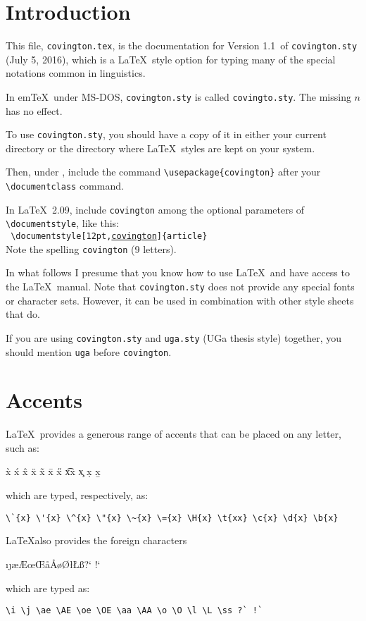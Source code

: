 \documentclass{article}
\def\pversion{Version 1.1}
\def\pdate{July 5, 2016}
\begin{document}
\section*{Introduction}
This file, \texttt{covington.tex}, is the documentation for \pversion\
of \texttt{covington.sty} (\pdate), which is a \LaTeX\ style 
option for typing many of the special notations common in linguistics.

{\footnotesize 
In em\TeX\ under MS-DOS, \texttt{covington.sty} is called \texttt{covingto.sty}.
The missing $n$ has no effect.}

To use \texttt{covington.sty}, you should have a copy of it in either your
current directory or the directory where \LaTeX\ styles are kept on your 
system.

Then, under \LaTeXe,
include the command
\verb"\usepackage{covington}"
after your \verb"\documentclass" command.

{\footnotesize
In \LaTeX\ 2.09,
include \texttt{covington} among the optional parameters of 
\verb"\documentstyle", like this: \hfill\\
{\tt
\verb"\documentstyle[12pt,"\underline{covington}\verb"]{article}"
}\hfill\\
Note the spelling \texttt{covington} (9 letters).
}

In what follows I presume that you know how to use \LaTeX\ and have 
access to the \LaTeX\ manual. Note that \texttt{covington.sty} does not 
provide any special fonts or character sets.  However, it can be used in 
combination with other style sheets that do.

If you are using \texttt{covington.sty} and \texttt{uga.sty} (UGa thesis style) 
together, you should mention \texttt{uga} before \texttt{covington}.

 
\section{Accents}

\LaTeX\ provides a generous range of accents that can be placed on any
letter, such as:
\begin{flushleft}
\`{x} \'{x} \^{x} \"{x} \~{x} \={x} \H{x} \t{xx} \c{x} \d{x} \b{x}
\end{flushleft}
which are typed, respectively, as:
\begin{verbatim}
\`{x} \'{x} \^{x} \"{x} \~{x} \={x} \H{x} \t{xx} \c{x} \d{x} \b{x}
\end{verbatim}
\LaTeX also provides the foreign characters
\begin{flushleft}\obeyspaces
\i \j \ae \AE \oe \OE \aa \AA \o \O \l \L \ss ?` !`
\end{flushleft}
which are typed as:
\begin{verbatim}
\i \j \ae \AE \oe \OE \aa \AA \o \O \l \L \ss ?` !`
\end{verbatim}
\end{document}
